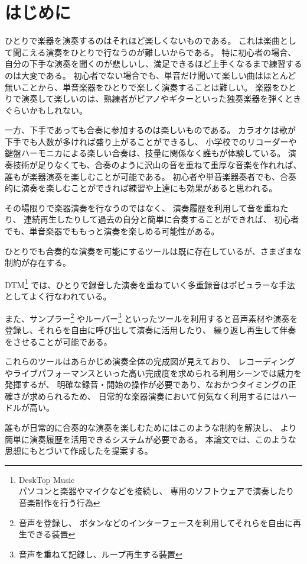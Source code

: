 %
%
\section{はじめに}
\label{sec:start}

ひとりで楽器を演奏するのはそれほど楽しくないものである。
これは楽曲として聞こえる演奏をひとりで行なうのが難しいからである。
特に初心者の場合、 自分の下手な演奏を聞くのが悲しいし、満足できるほど上手くなるまで練習するのは大変である。
初心者でない場合でも、単音だけ聞いて楽しい曲はほとんど無いことから、単音楽器をひとりで楽しく演奏することは難しい。
楽器をひとりで演奏して楽しいのは、熟練者がピアノやギターといった独奏楽器を弾くときぐらいかもしれない。

一方、下手であっても合奏に参加するのは楽しいものである。
カラオケは歌が下手でも人数が多ければ盛り上がることができるし、
小学校でのリコーダーや鍵盤ハーモニカによる楽しい合奏は、技量に関係なく誰もが体験している。
演奏技術が足りなくても、合奏のように沢山の音を重ねて重厚な音楽を作れれば、誰もが楽器演奏を楽しむことが可能である。
初心者や単音楽器奏者でも、合奏的に演奏を楽しむことができれば練習や上達にも効果があると思われる。

その場限りで楽器演奏を行なうのではなく、
演奏履歴を利用して音を重ねたり、
連続再生したりして過去の自分と簡単に合奏することができれば、
初心者でも、単音楽器でももっと演奏を楽しめる可能性がある。

ひとりでも合奏的な演奏を可能にするツールは既に存在しているが、さまざまな制約が存在する。

DTM\footnote{\textsf{DeskTop Music\\パソコンと楽器やマイクなどを接続し、
    専用のソフトウェアで演奏したり音楽制作を行う行為}}
では、ひとりで録音した演奏を重ねていく多重録音はポピュラーな手法としてよく行なわれている。\cite{jacob}\cite{resound}

また、サンプラー\footnote{\textsf{音声を登録し、
    ボタンなどのインターフェースを利用してそれらを自由に再生できる装置}}
やルーパー\footnote{\textsf{音声を重ねて記録し、ループ再生する装置}}
といったツールを利用すると音声素材や演奏を登録し、それらを自由に呼び出して演奏に活用したり、
繰り返し再生して伴奏をさせることが可能である。

これらのツールはあらかじめ演奏全体の完成図が見えており、
レコーディングやライブパフォーマンスといった高い完成度を求められる利用シーンでは威力を発揮するが、
明確な録音・開始の操作が必要であり、なおかつタイミングの正確さが求められるため、
日常的な楽器演奏において何気なく利用するにはハードルが高い。

誰もが日常的に合奏的な演奏を楽しむためにはこのような制約を解決し、
より簡単に演奏履歴を活用できるシステムが必要である。
本論文では、このような思想にもとづいて作成した{\system}を提案する。
